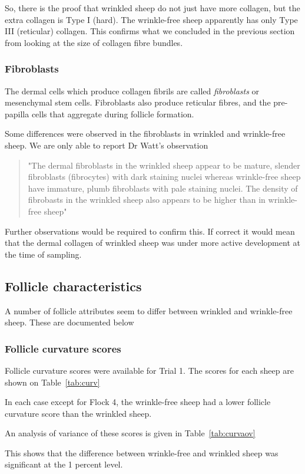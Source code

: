 \documentclass[titlepage]{article}  %
\begin{document}
So, there is the proof that wrinkled sheep do not just have more collagen, but the extra collagen is Type I (hard). The wrinkle-free sheep apparently has only Type III (reticular) collagen. This confirms what we concluded in the previous section from looking at the size of collagen fibre bundles.

\subsubsection{Fibroblasts}
The dermal cells which produce collagen fibrils are called {\em fibroblasts} or mesenchymal stem cells.  Fibroblasts also produce reticular fibres, and the pre-papilla cells that aggregate during follicle formation.

Some differences were observed in the fibroblasts in wrinkled and wrinkle-free sheep. We are only able to report Dr Watt's observation
\begin{quote}
"The dermal fibroblasts in the wrinkled sheep appear to be mature, slender fibroblasts (fibrocytes) with dark staining nuclei whereas wrinkle-free sheep have immature, plumb fibroblasts with pale staining nuclei. The density of fibrobasts in the wrinkled sheep also appears to be higher than in wrinkle-free sheep"
\end{quote}

Further observations would be required to confirm this. If correct it would mean that the dermal collagen of wrinkled sheep was under more active development at the time of sampling.

\subsection{Follicle characteristics}
A number of follicle attributes seem to differ between wrinkled and wrinkle-free sheep. These are documented below

\subsubsection{Follicle curvature scores}
Follicle curvature scores were available for Trial 1. The scores for each sheep are shown on Table~\ref{tab:curv}

In each case except for Flock 4, the wrinkle-free sheep had a lower follicle curvature score than the wrinkled sheep.

An analysis of variance of these scores is given in Table~\ref{tab:curvaov}

This shows that the difference between wrinkle-free and wrinkled sheep was significant at the 1 percent level.
\end{document}
